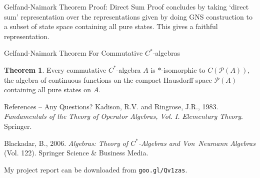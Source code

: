 \documentclass[11pt]{beamer}
\theoremstyle{definition}
\newtheorem{thm}{Theorem}
\renewcommand{\P}[1]{\mathscr{P}(#1)}
\begin{document}
\begin{frame} {Gelfand-Naimark Theorem} {Proof: Direct Sum}
	Proof concludes by taking `direct sum' representation over the representations 
	given by doing GNS construction to a subset of state space containing all pure 
	states. This gives a faithful representation.
\end{frame}

\begin{frame} {Gelfand-Naimark Theorem} {For Commutative $C^\ast$-algebras}
	\begin{thm}
		Every commutative $C^\ast$-algebra $A$ is $\ast$-isomorphic to $C(\P A)$, the 
		algebra of continuous functions on the compact Hausdorff space $\P A$ containing 
		all pure states on $A$. 
	\end{thm}
\end{frame} 


\begin{frame} {References -- Any Questions?}
	Kadison, R.V. and Ringrose, J.R., 1983. 
	\textit{Fundamentals of the Theory of Operator Algebras, Vol. I. Elementary Theory}. 
	Springer.
	
	Blackadar, B., 2006. 
	\textit{Algebras: Theory of $C^\ast$-Algebras and Von~Neumann 
	Algebras} (Vol. 122). 
	Springer Science \& Business Media.

	\vfill

	My project report can be downloaded from \texttt{goo.gl/Qv1zas}.
\end{frame}
\end{document}
